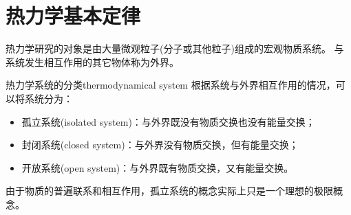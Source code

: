 \newcommand{\pu}[3][{}]{\biggp{\pv{#2}{#3}}_{#1}}

\chapter{热力学基本定律}


热力学研究的对象是由大量微观粒子(分子或其他粒子)组成的宏观物质系统。
与系统发生相互作用的其它物体称为外界。

\begin{definition}
	{热力学系统的分类}{thermodynamical system}
	根据系统与外界相互作用的情况，可以将系统分为：
	\begin{itemize}
		\item 孤立系统(isolated system)：与外界既没有物质交换也没有能量交换；
		\item 封闭系统(closed system)：与外界没有物质交换，但有能量交换；
		\item 开放系统(open system)：与外界既有物质交换，又有能量交换。
	\end{itemize}
\end{definition}

\begin{remark}
	由于物质的普遍联系和相互作用，孤立系统的概念实际上只是一个理想的极限概念。
\end{remark}


